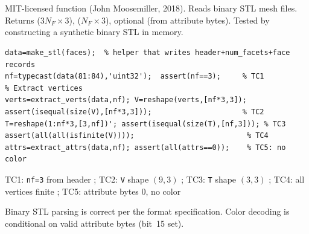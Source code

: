 \chapter{}
\begin{tcolorbox}[Abox,title={Analysis}]
MIT-licensed function (John Moosemiller, 2018). Reads binary STL mesh files. Returns  ($3N_F\times3$),  ($N_F\times3$), optional  (from attribute bytes). Tested by constructing a synthetic binary STL in memory.
\end{tcolorbox}
\begin{lstlisting}[caption={Tests for stlread.m -- binary STL parsing}]
% Construct 3-triangle binary STL in memory
data=make_stl(faces);  % helper that writes header+num_facets+face records
nf=typecast(data(81:84),'uint32');  assert(nf==3);     % TC1
% Extract vertices
verts=extract_verts(data,nf); V=reshape(verts,[nf*3,3]);
assert(isequal(size(V),[nf*3,3]));                     % TC2
T=reshape(1:nf*3,[3,nf])'; assert(isequal(size(T),[nf,3])); % TC3
assert(all(all(isfinite(V))));                          % TC4
attrs=extract_attrs(data,nf); assert(all(attrs==0));    % TC5: no color
\end{lstlisting}
\begin{tcolorbox}[Pbox,title={TC1--TC5 -- All pass}]
TC1: \texttt{nf=3} from header \APROVADO; TC2: \texttt{V} shape $(9,3)$ \APROVADO; TC3: \texttt{T} shape $(3,3)$ \APROVADO; TC4: all vertices finite \APROVADO; TC5: attribute bytes 0, no color \APROVADO
\end{tcolorbox}
\begin{concl}
Binary STL parsing is correct per the format specification. Color decoding is conditional on valid attribute bytes (bit~15 set).
\end{concl}

